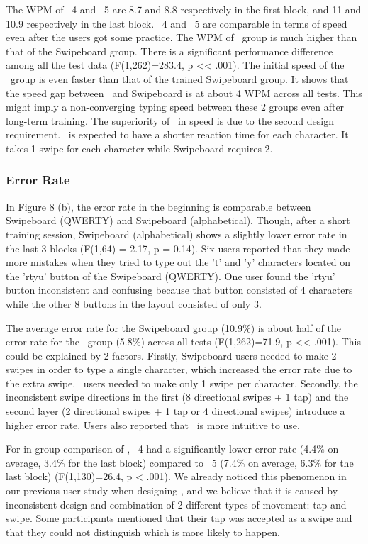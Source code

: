 The WPM of \papertitle\ 4 and \papertitle\ 5 are 8.7 and 8.8 respectively in the first block, and 11 and 10.9 respectively in the last block. \papertitle\ 4 and \papertitle\ 5 are comparable in terms of speed even after the users got some practice. The WPM of \papertitle\ group is much higher than that of the Swipeboard group. There is a significant performance difference among all the test data (F(1,262)=283.4, p << .001). The initial speed of the \papertitle\ group is even faster than that of the trained Swipeboard group. It shows that the speed gap between \papertitle\ and Swipeboard is at about 4 WPM across all tests. This might imply a non-converging typing speed between these 2 groups even after long-term training. The superiority of \papertitle\ in speed is due to the second design requirement. \papertitle\ is expected to have a shorter reaction time for each character. It takes 1 swipe for each character while Swipeboard requires 2.

\subsubsection{Error Rate}
In Figure 8 (b), the error rate in the beginning is comparable between Swipeboard (QWERTY) and Swipeboard (alphabetical). Though, after a short training session, Swipeboard (alphabetical) shows a slightly lower error rate in the last 3 blocks (F(1,64) = 2.17, p = 0.14). Six users reported that they made more mistakes when they tried to type out the 't' and 'y' characters located on the 'rtyu' button of the Swipeboard (QWERTY). One user found the 'rtyu' button inconsistent and confusing because that button consisted of 4 characters while the other 8 buttons in the layout consisted of only 3. 

The average error rate for the Swipeboard group (10.9\%) is about half of the error rate for the \papertitle\ group (5.8\%) across all tests (F(1,262)=71.9, p << .001). This could be explained by 2 factors. Firstly, Swipeboard users needed to make 2 swipes in order to type a single character, which increased the error rate due to the extra swipe. \papertitle\ users needed to make only 1 swipe per character. Secondly, the inconsistent swipe directions in the first (8 directional swipes + 1 tap) and the second layer (2 directional swipes + 1 tap or 4 directional swipes) introduce a higher error rate. Users also reported that \papertitle\ is more intuitive to use.

For in-group comparison of \papertitle, \papertitle\ 4 had a significantly lower error rate (4.4\% on average, 3.4\% for the last block) compared to \papertitle\ 5 (7.4\% on average, 6.3\% for the last block) (F(1,130)=26.4, p < .001). We already noticed this phenomenon in our previous user study when designing \papertitle, and we believe that it is caused by inconsistent design and combination of 2 different types of movement: tap and swipe. Some participants mentioned that their tap was accepted as a swipe and that they could not distinguish which is more likely to happen. 

